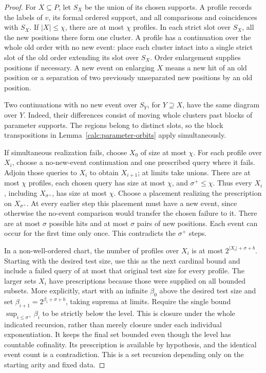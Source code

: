 \begin{proof}
For $X\subseteq P$, let $S_X$ be the union of its chosen supports.  A
profile records the labels of $v$, its formal ordered support, and all
comparisons and coincidences with $S_X$.  If $|X|\le\chi$, there are at
most $\chi$ profiles.  In each strict slot over $S_X$, all the new
positions there form one cluster.  A profile has a continuation over the
whole old order with no new event: place each cluster intact into a
single strict slot of the old order extending its slot over $S_X$.
Order enlargement supplies positions if necessary.  A new event on
enlarging $X$ means a new hit of an old position or a separation of two
previously unseparated new positions by an old position.

Two continuations with no new event over $S_Y$, for $Y\supseteq X$,
have the same diagram over $Y$.  Indeed, their differences consist of
moving whole clusters past blocks of parameter supports.  The regions
belong to distinct slots, so the block transpositions in
Lemma~\ref{calc:parameter-orbits} apply simultaneously.

If simultaneous realization fails, choose $X_0$ of size at most $\chi$.
For each profile over $X_i$, choose a no-new-event continuation and one
prescribed query where it fails.  Adjoin those queries to $X_i$ to obtain
$X_{i+1}$; at limits take unions.  There are at most $\chi$ profiles,
each chosen query has size at most $\chi$, and $\sigma^+\le\chi$.
Thus every $X_i$, including $X_{\sigma^+}$, has size at most $\chi$.
Choose a placement realizing the prescription on $X_{\sigma^+}$.
At every earlier step this placement must have a new event, since
otherwise the no-event comparison would transfer the chosen failure to
it.  There are at most $\sigma$ possible hits and at most $\sigma$
pairs of new positions.  Each event can occur for the first time only
once.  This contradicts the $\sigma^+$ steps.

In a non-well-ordered chart, the number of profiles over $X_i$ is at most
$2^{|X_i|+\sigma+b}$.  Starting with the desired test size, use this as
the next cardinal bound and include a failed query of at most that
original test size for every profile.  The larger sets $X_i$ have
prescriptions because those were supplied on all bounded subsets.
More explicitly, start with an infinite $\beta_0$ above the desired
test size and set $\beta_{i+1}=2^{\beta_i+\sigma+b}$, taking suprema
at limits.  Require the single bound
$\sup_{i\le\sigma^+}\beta_i$ to be strictly below the level.
This is closure under the whole indicated recursion, rather than
merely closure under each individual exponentiation.  It keeps the
final set bounded even though the level has countable cofinality.
Its prescription
is available by hypothesis, and the identical event count is a
contradiction.  This is a set recursion depending only on the starting
arity and fixed data.
\end{proof}

